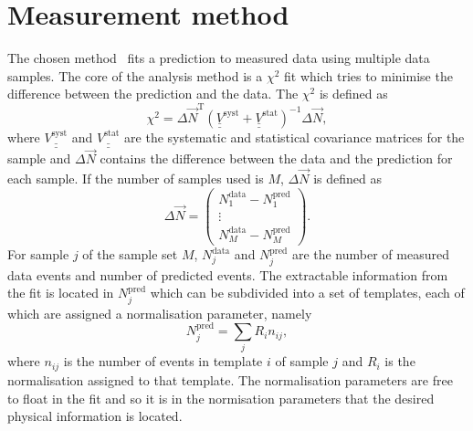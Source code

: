 \section{Measurement method}
\label{sec:MeasurementMethod}
The chosen method~\cite{PhysRevD.78.032003, PhysRevD.83.012005} fits a prediction to measured data using multiple data samples.  The core of the analysis method is a $\chi^2$ fit which tries to minimise the difference between the prediction and the data.  The $\chi^2$ is defined as 
\begin{equation}
  \chi^2 = \Delta \vec{N}^{\textrm{T}} \left(\underline{\underline{V}}^{\textrm{syst}} + \underline{\underline{V}}^{\textrm{stat}} \right)^{-1} \Delta \vec{N},
  \label{eqn:Chi2Def}
\end{equation}
where $\underline{\underline{V^{\textrm{syst}}}}$ and $\underline{\underline{V^{\textrm{stat}}}}$ are the systematic and statistical covariance matrices for the sample and $\Delta\vec{N}$ contains the difference between the data and the prediction for each sample.  If the number of samples used is $M$, $\Delta\vec{N}$ is defined as 
\begin{equation}
  \Delta\vec{N} = 
  \begin{pmatrix}
    N^{\textrm{data}}_1 - N^{\textrm{pred}}_1 \\
    \vdots \\
    N^{\textrm{data}}_M - N^{\textrm{pred}}_M
  \end{pmatrix}.
  \label{eqn:VecNDef}
\end{equation}
For sample $j$ of the sample set $M$, $N^{\textrm{data}}_j$ and $N^{\textrm{pred}}_j$ are the number of measured data events and number of predicted events.  The extractable information from the fit is located in $N^{\textrm{pred}}_j$ which can be subdivided into a set of templates, each of which are assigned a normalisation parameter, namely
\begin{equation}
  N^{\textrm{pred}}_j = \sum_j R_{i}n_{ij},
  \label{eqn:NPredDef}
\end{equation}
where $n_{ij}$ is the number of events in template $i$ of sample $j$ and $R_{i}$ is the normalisation assigned to that template.  The normalisation parameters are free to float in the fit and so it  is in the normisation parameters that the desired physical information is located.

